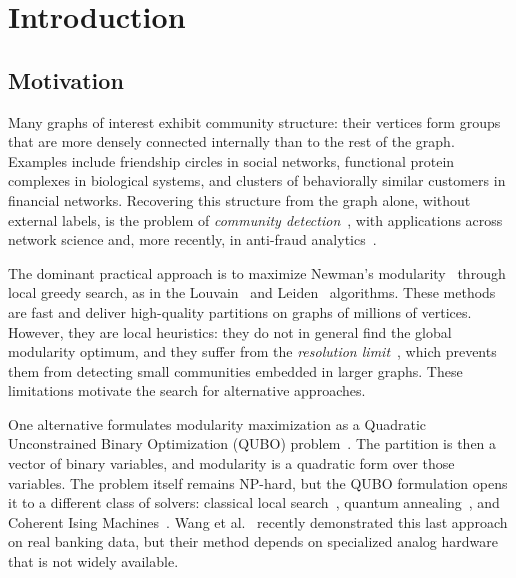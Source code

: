 
\section{Introduction}
\label{sec:introduction}

\subsection{Motivation}
\label{sec:motivation}

Many graphs of interest exhibit community structure: their vertices
form groups that are more densely connected internally than to the
rest of the graph. Examples include friendship circles in social
networks, functional protein complexes in biological systems, and
clusters of behaviorally similar customers in financial networks.
Recovering this structure from the graph alone, without external
labels, is the problem of \emph{community
detection}~\cite{fortunato2010community}, with applications across
network science and, more recently, in anti-fraud
analytics~\cite{wang2024quantum}.

The dominant practical approach is to maximize Newman's
modularity~\cite{newman2006modularity} through local greedy search,
as in the Louvain~\cite{blondel2008louvain} and
Leiden~\cite{traag2019leiden} algorithms. These methods are fast and
deliver high-quality partitions on graphs of millions of vertices.
However, they are local heuristics: they do not in general find the
global modularity optimum, and they suffer from the \emph{resolution
limit}~\cite{fortunato2007resolution}, which prevents them from
detecting small communities embedded in larger graphs. These
limitations motivate the search for alternative approaches.

One alternative formulates modularity maximization as a Quadratic
Unconstrained Binary Optimization (QUBO)
problem~\cite{lucas2014ising}. The partition is then a vector of
binary variables, and modularity is a quadratic form over those
variables. The problem itself remains NP-hard, but the QUBO
formulation opens it to a different class of solvers: classical
local search~\cite{ushijima2017graph}, quantum
annealing~\cite{negre2020detecting}, and Coherent Ising
Machines~\cite{wang2024quantum}. Wang et
al.~\cite{wang2024quantum} recently demonstrated this last approach
on real banking data, but their method depends on specialized analog
hardware that is not widely available.

